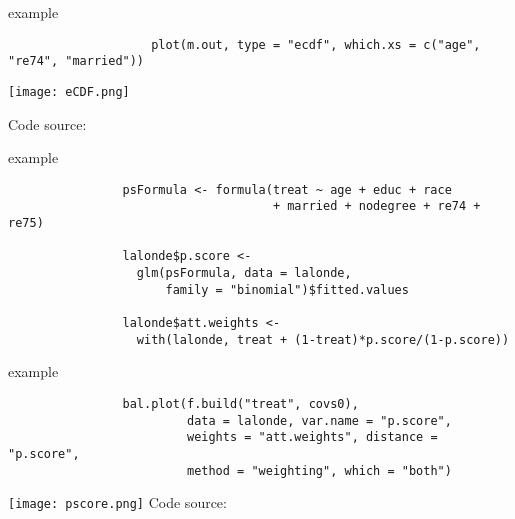 \documentclass[aspectratio=169]{beamer}
\begin{document}
		\begin{frame}[fragile]{example}
			\begin{verbatim}
					plot(m.out, type = "ecdf", which.xs = c("age", "re74", "married"))
			\end{verbatim}
			\texttt{[image: eCDF.png]}
				\begin{center}
				\tiny{ Code source: \href{https://kosukeimai.github.io/MatchIt/articles/assessing-balance.html}{\underline{}}}
			\end{center}
		\end{frame}

		\begin{frame}[fragile]{example}
			\begin{verbatim}
				psFormula <- formula(treat ~ age + educ + race
				                     + married + nodegree + re74 + re75)

				lalonde$p.score <-
				  glm(psFormula, data = lalonde,
				      family = "binomial")$fitted.values

				lalonde$att.weights <-
				  with(lalonde, treat + (1-treat)*p.score/(1-p.score))
			\end{verbatim}
		\end{frame}

		\begin{frame}[fragile]{example}
			\begin{verbatim}
				bal.plot(f.build("treat", covs0),
				         data = lalonde, var.name = "p.score",
				         weights = "att.weights", distance = "p.score",
				         method = "weighting", which = "both")
			\end{verbatim}
			\begin{center}
				\texttt{[image: pscore.png]}
				\tiny{Code source: \href{https://mran.microsoft.com/snapshot/2017-08-06/web/packages/cobalt/vignettes/cobalt_basic_use.html}{\underline{}}}
			\end{center}
		\end{frame}
\end{document}
